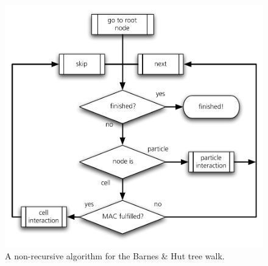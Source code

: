 \begin{figure}[htbp]
\begin{center}
\includegraphics[scale=0.6]{19algo_gravwalk.pdf}
\caption{A non-recursive algorithm for the Barnes \& Hut tree walk.}
\label{ch02_fig19}
\end{center}
\end{figure}

